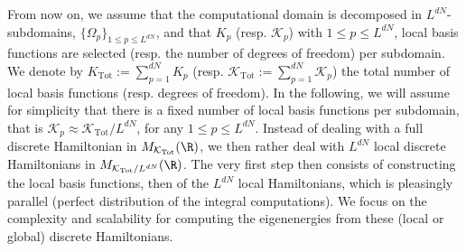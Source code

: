  From now on, we assume that the computational domain is decomposed in $L^{dN}$-subdomains, $\{\Omega_{p}\}_{1\leq p \leq L^{dN}}$, and that $K_{p}$ (resp. $\mathcal{K}_p$) with $1 \leq p \leq L^{dN}$, local basis functions are selected (resp. the number of degrees of freedom) per subdomain. We denote by $K_{\textrm{Tot}}:=\sum_{p=1}^{dN} K_{p}$ (resp. $\mathcal{K}_{\textrm{Tot}}:=\sum_{p=1}^{dN} \mathcal{K}_{p}$) the total number of local basis functions (resp. degrees of freedom). In the following, we will assume for simplicity that there is a fixed number of local basis functions per subdomain, that is $\mathcal{K}_{p} \approx \mathcal{K}_{\textrm{Tot}}/L^{dN}$, for any $1 \leq p \leq L^{dN}$. Instead of dealing with a full discrete Hamiltonian in $M_{\mathcal{K}_{\textrm{Tot}}}(\R)$, we then rather deal with $L^{dN}$ local discrete Hamiltonians in $M_{\mathcal{K}_{\textrm{Tot}}/L^{dN}}(\R)$. The very first step then consists of constructing the local basis functions, then of the $L^{dN}$ local Hamiltonians, which is pleasingly parallel (perfect distribution of the integral computations). We focus on the complexity and scalability for computing the eigenenergies from these (local or global) discrete Hamiltonians. \\
\\
